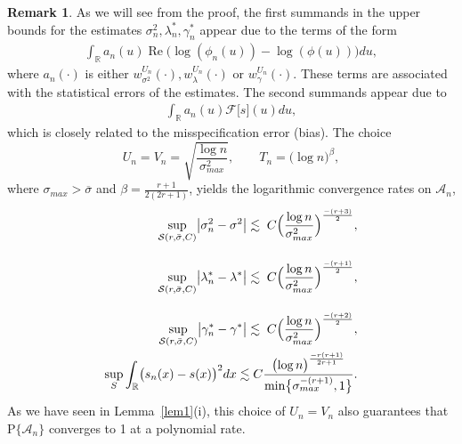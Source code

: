 \documentclass[a4paper,11pt]{article}
\theoremstyle{definition}
\newtheorem{remark}{Remark}
\newcommand{\R}{{\mathbb{R}}}
\newcommand{\1}{\mathbb{I}}
\newcommand{\A}{\mathscr{A}}
\renewcommand{\S}{S}
\renewcommand{\A}{\mathcal{A}}
\def\R{\mathbb{R}}
\renewcommand{\Re}{\operatorname{Re}}
\renewcommand{\P}{{\mathrm P}}
\newcommand{\F}{\mathcal{F}}
\theoremstyle{remark}
\begin{document}
\begin{remark} \label{rem1}
As we will see from the proof, the first summands in the upper bounds for the estimates \(\sigma_n^2, \lambda_n^*, \gamma_n^*\)  appear due to the terms of the form
\begin{eqnarray*}
\int_{\R} a_n(u)\Re\bigl(\log(\phi_n(u)) - \log(\phi(u))\bigr)du, 
\end{eqnarray*} 
where \(a_n(\cdot)\) is either \(w^{U_n}_{\sigma^2}(\cdot), w^{U_n}_{\lambda}(\cdot)\) or \(w^{U_n}_{\gamma}(\cdot)\). These terms are associated with the statistical errors of the estimates. The second summands appear due to 
\begin{eqnarray*}
\int_{\R}a_{n}(u)\F \bigl[s\bigr](u)du,
\end{eqnarray*}
which is closely related to the misspecification error (bias). The choice $$U_n =V_n= \sqrt{\frac{\log n}{\sigma^2_{max}}}, \qquad T_n = \bigl( \log n \bigr)^{\beta},$$ where $\sigma_{max} > \overline{\sigma}$ and \(\beta=\frac{r+1}{2(2r+1)}\), yields the logarithmic convergence rates on $\A_n$, %
\begin{align*}
\sup_{\mathcal{S}(r, \bar{\sigma}, C)}
\bigl|\sigma^2_n - \sigma^2
\bigr| \lesssim \;C
\Bigl(\frac{\log n}{\sigma^2_{max}}\Bigr)^{\frac{-(r + 3)}{2}}, \\[1em]
\sup_{\mathcal{S}(r, \bar{\sigma}, C)}
\bigl|\lambda^*_n - \lambda^*
\bigr| \lesssim \; C \Bigl(\frac{\log n}{\sigma^2_{max}}\Bigr)^{\frac{-(r + 1)}{2}}, \\[1em]
\sup_{\mathcal{S}(r, \bar{\sigma}, C)}
\bigl|\gamma^*_n - \gamma^*
\bigr| \lesssim \; C \Bigl(\frac{\log n}{\sigma^2_{max}}\Bigr)^{\frac{-(r + 2)}{2}},\\
\sup_{\S} \int_{\R} \bigl( 
s_n(x) - s(x) 
\bigr)^2 dx \lesssim 
C \frac{\bigl(\log n\bigr)^{\frac{-r(r+1)}{2r+1}}}{\min\bigl\{\sigma_{max}^{-(r+1)}, 1\bigr\}}.
\end{align*}
As we have seen  in Lemma~\ref{lem1}(i), this choice of \(U_n=V_n\) also guarantees that \(\P\{\A_n\}\) converges to 1 at a polynomial rate.
 \end{remark}
\end{document}
